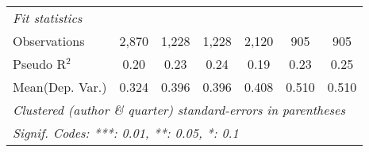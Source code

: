 \begin{tabular}{lcccccc}
   \midrule
   \emph{Fit statistics}\\
   Observations            & 2,870   & 1,228   & 1,228   & 2,120       & 905     & 905\\  
   Pseudo R$^2$            & 0.20    & 0.23    & 0.24    & 0.19        & 0.23    & 0.25\\  
Mean(Dep. Var.) & 0.324 & 0.396 & 0.396 & 0.408 & 0.510 & 0.510 \\
   \midrule \midrule
   \multicolumn{7}{l}{\emph{Clustered (author \& quarter) standard-errors in parentheses}}\\
   \multicolumn{7}{l}{\emph{Signif. Codes: ***: 0.01, **: 0.05, *: 0.1}}\\
\end{tabular}
\par\endgroup
